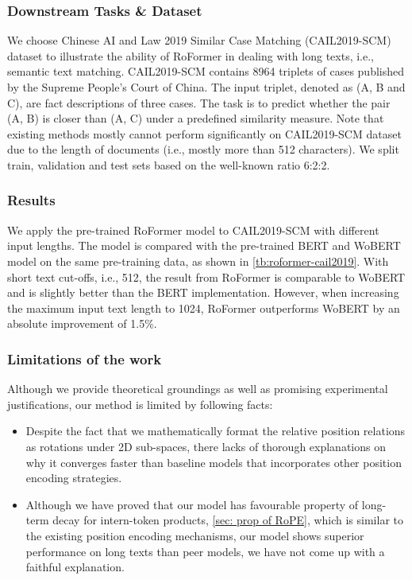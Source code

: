 \subsubsection{Downstream Tasks \& Dataset} We choose Chinese AI and Law 2019 Similar Case Matching (CAIL2019-SCM)\cite{cail2019scm} dataset to illustrate the ability of RoFormer in dealing with long texts, i.e., semantic text matching. CAIL2019-SCM contains 8964 triplets of cases published by the Supreme People's Court of China. The input triplet, denoted as (A, B and C), are fact descriptions of three cases. The task is to predict whether the pair (A, B) is closer than (A, C) under a predefined similarity measure. Note that existing methods mostly cannot perform significantly on CAIL2019-SCM dataset due to the length of documents (i.e., mostly more than 512 characters). We split train, validation and test sets based on the well-known  ratio  6:2:2.

\subsubsection{Results} 
We apply the pre-trained RoFormer model to CAIL2019-SCM with different input lengths. The model is compared with the pre-trained BERT and WoBERT model on the same pre-training data,  as shown in \ref{tb:roformer-cail2019}. With short text cut-offs, i.e., 512, the result from RoFormer is comparable to WoBERT and is slightly better than the BERT implementation. However, when increasing the maximum input text length to 1024, RoFormer outperforms WoBERT by an absolute improvement of 1.5\%. 

\subsubsection{Limitations of the work} Although we provide theoretical groundings as well as promising experimental justifications, our method is limited by following facts:

\begin{itemize}
	\item Despite the fact that we mathematically format the relative position relations as rotations under 2D sub-spaces, there lacks of thorough explanations on why it converges faster than baseline models that incorporates other position encoding strategies.
	\item Although we have proved that our model has favourable property of long-term decay for intern-token products, \ref{sec: prop of RoPE}, which is similar to the existing position encoding mechanisms, our model shows superior performance on long texts than peer models, we have not come up with a faithful explanation.
\end{itemize}

